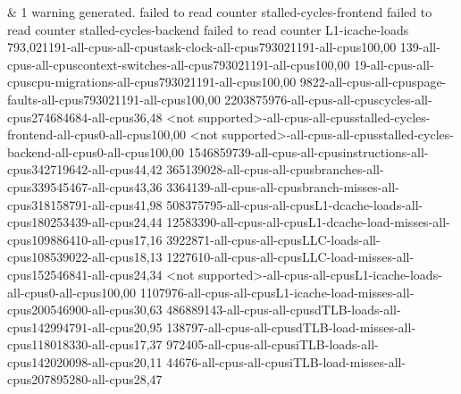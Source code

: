 &
1 warning generated. failed to read counter stalled-cycles-frontend failed to read counter stalled-cycles-backend failed to read counter L1-icache-loads 793,021191-all-cpus-all-cpustask-clock-all-cpus793021191-all-cpus100,00 139-all-cpus-all-cpuscontext-switches-all-cpus793021191-all-cpus100,00 19-all-cpus-all-cpuscpu-migrations-all-cpus793021191-all-cpus100,00 9822-all-cpus-all-cpuspage-faults-all-cpus793021191-all-cpus100,00 2203875976-all-cpus-all-cpuscycles-all-cpus274684684-all-cpus36,48 <not supported>-all-cpus-all-cpusstalled-cycles-frontend-all-cpus0-all-cpus100,00 <not supported>-all-cpus-all-cpusstalled-cycles-backend-all-cpus0-all-cpus100,00 1546859739-all-cpus-all-cpusinstructions-all-cpus342719642-all-cpus44,42 365139028-all-cpus-all-cpusbranches-all-cpus339545467-all-cpus43,36 3364139-all-cpus-all-cpusbranch-misses-all-cpus318158791-all-cpus41,98 508375795-all-cpus-all-cpusL1-dcache-loads-all-cpus180253439-all-cpus24,44 12583390-all-cpus-all-cpusL1-dcache-load-misses-all-cpus109886410-all-cpus17,16 3922871-all-cpus-all-cpusLLC-loads-all-cpus108539022-all-cpus18,13 1227610-all-cpus-all-cpusLLC-load-misses-all-cpus152546841-all-cpus24,34 <not supported>-all-cpus-all-cpusL1-icache-loads-all-cpus0-all-cpus100,00 1107976-all-cpus-all-cpusL1-icache-load-misses-all-cpus200546900-all-cpus30,63 486889143-all-cpus-all-cpusdTLB-loads-all-cpus142994791-all-cpus20,95 138797-all-cpus-all-cpusdTLB-load-misses-all-cpus118018330-all-cpus17,37 972405-all-cpus-all-cpusiTLB-loads-all-cpus142020098-all-cpus20,11 44676-all-cpus-all-cpusiTLB-load-misses-all-cpus207895280-all-cpus28,47
